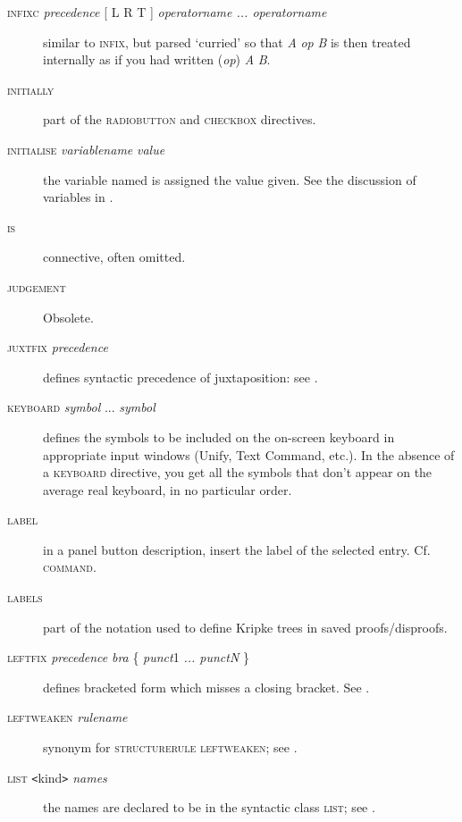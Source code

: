 \begin{description}
\item[\textsc{infixc} \textit{precedence} \textsc{[} L {\textbar} R {\textbar} T \textsc{]} \textit{operatorname ... operatorname}] similar to \textsc{infix}, but parsed `curried' so that \textit{A} \textit{op} \textit{B} is then treated internally as if you had written (\textit{op}) \textit{A} \textit{B}.

\item[\textsc{initially}] part of the \textsc{radiobutton} and \textsc{checkbox} directives.

\item[\textsc{initialise} \textit{variablename} \textit{value}] the variable named is assigned the value given. See the discussion of variables in .

\item[\textsc{is}] connective, often omitted.

\item[\textsc{judgement}] Obsolete.

\item[\textsc{juxtfix} \textit{precedence}] defines syntactic precedence of juxtaposition: see .

\item[\textsc{keyboard} \textit{symbol} ... \textit{symbol}] defines the symbols to be included on the on-screen keyboard in appropriate input windows (Unify, Text Command, etc.). In the absence of a \textsc{keyboard} directive, you get all the symbols that don't appear on the average real keyboard, in no particular order.

\item[\textsc{label}] in a panel button description, insert the label of the selected entry. Cf. \textsc{command}.

\item[\textsc{labels}] part of the notation used to define Kripke trees in saved proofs/disproofs.

\item[\textsc{leftfix} \textit{precedence} \textit{bra} \{ \textit{punct}1 \textit{... punctN} \}] defines bracketed form which misses a closing bracket. See .

\item[\textsc{leftweaken} \textit{rulename}] synonym for \textsc{structurerule} \textsc{leftweaken}; see .

\item[\textsc{list \texttt{<}}kind\textsc{\texttt{>}} \textit{names}] the names are declared to be in the syntactic class \textsc{list}; see .


\end{description}
